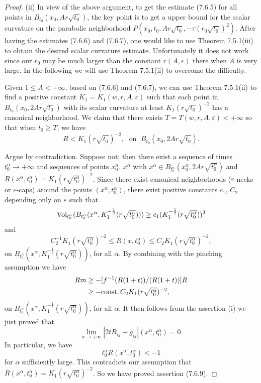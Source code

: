 \begin{proof}
\medskip
(ii) In view of the above argument, to get the estimate (7.6.5)
for all points in $B_{t_0}(x_0,Ar\sqrt{t_0})$, the key point is to
get a upper bound for the scalar curvature on the parabolic
neighborhood $P(x_0,t_0,Ar\sqrt{t_0},-\tau(r_0\sqrt{t_0})^2)$.
After having the estimates (7.6.6) and (7.6.7), one would like to
use Theorem 7.5.1(iii) to obtain the desired scalar curvature
estimate. Unfortunately it does not work since our $r_0$ may be
much larger than the constant $\bar{r}(A,\varepsilon)$ there when
$A$ is very large. In the following we will use Theorem 7.5.1(ii)
to overcome the difficulty.

Given $1 \leq A<+\infty$, based on (7.6.6) and (7.6.7), we can use
Theorem 7.5.1(ii) to find a positive constant
$K_1=K_1(w,r,A,\varepsilon)$ such that each point in
$B_{t_0}(x_0,2Ar\sqrt{t_0})$ with its scalar curvature at least
$K_1(r\sqrt{t_0})^{-2}$ has a canonical neighborhood. We claim
that there exists $T=T(w,r,A,\varepsilon)<+\infty$ so that when
$t_0\geq T$, we have \begin{equation} R<K_1(r\sqrt{t_0})^{-2},\; \mbox{ on } \;
B_{t_0}(x_0,2Ar\sqrt{t_0}). %
\end{equation}

Argue by contradiction. Suppose not; then there exist a sequence
of times $t^{\alpha}_0\rightarrow+\infty$ and sequences of points
$x^{\alpha}_0$, $x^{\alpha}$ with $x^{\alpha}\in
B_{t^{\alpha}_0}(x^{\alpha}_0,2Ar\sqrt{t^{\alpha}_0})$ and
$R(x^{\alpha},t^{\alpha}_0)=K_1(r\sqrt{t^{\alpha}_0})^{-2}$. Since
there exist canonical neighborhoods ($\varepsilon$-necks or
$\varepsilon$-caps) around the points $(x^{\alpha},t^{\alpha}_0)$,
there exist positive constants $c_1$, $C_2$ depending only on
$\varepsilon$ such that
$$
\operatorname{Vol}_{t^{\alpha}_0}(B_{t^{\alpha}_0}(x^{\alpha},
K^{-\frac{1}{2}}_1(r\sqrt{t^{\alpha}_0})))\geq
c_1(K^{-\frac{1}{2}}_1(r\sqrt{t^{\alpha}_0}))^3
$$
and
$$
C^{-1}_2K_1(r\sqrt{t^{\alpha}_0})^{-2} \leq R(x,t^{\alpha}_0) \leq
C_2K_1(r\sqrt{t^{\alpha}_0})^{-2},
$$
on $B_{t^{\alpha}_0} (x^{\alpha}, K^{-\frac{1}{2}}_1
(r\sqrt{t^{\alpha}_0}))$, for all $\alpha$. By combining with the
pinching assumption we have
\begin{align*}
Rm&  \geq-[f^{-1}(R(1+t))/(R(1+t))]R\\
&  \geq -{\rm const.}\, C_2K_1(r\sqrt{t^{\alpha}_0})^{-2},
\end{align*}
on
$B_{t^{\alpha}_0}(x^{\alpha},K^{-\frac{1}{2}}_1(r\sqrt{t^{\alpha}_0}))$,
for all $\alpha$. It then follows from the assertion (i) we just
proved that
$$
\lim_{\alpha\rightarrow+\infty}|2tR_{ij}+g_{ij}|
(x^{\alpha},t^{\alpha}_0)=0.
$$
In particular, we have
$$
t^{\alpha}_0R(x^{\alpha},t^{\alpha}_0)<-1
$$
for $\alpha$ sufficiently large. This contradicts our assumption
that $R(x^{\alpha},t^{\alpha}_0)=K_1(r\sqrt{t^{\alpha}_0})^{-2}$.
So we have proved assertion (7.6.9).


\end{proof}
